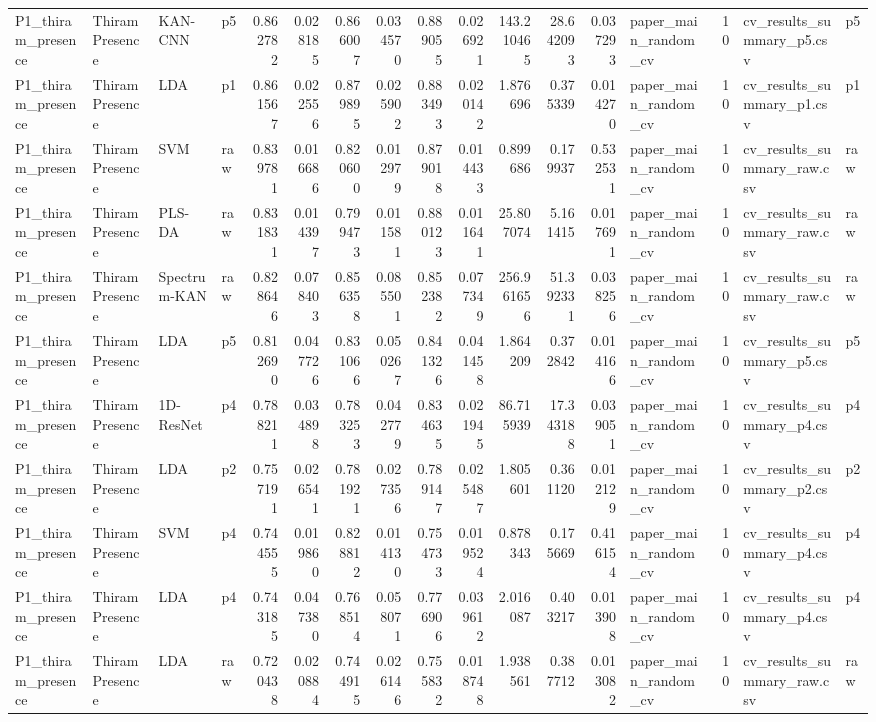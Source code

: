 \begin{tabular}{llllrrrrrrrrrlrll}
P1_thiram_presence & Thiram Presence & KAN-CNN & p5 & 0.862782 & 0.028185 & 0.866007 & 0.034570 & 0.889055 & 0.026921 & 143.210465 & 28.642093 & 0.037293 & paper_main_random_cv & 10 & cv_results_summary_p5.csv & p5 \\
P1_thiram_presence & Thiram Presence & LDA & p1 & 0.861567 & 0.022556 & 0.879895 & 0.025902 & 0.883493 & 0.020142 & 1.876696 & 0.375339 & 0.014270 & paper_main_random_cv & 10 & cv_results_summary_p1.csv & p1 \\
P1_thiram_presence & Thiram Presence & SVM & raw & 0.839781 & 0.016686 & 0.820600 & 0.012979 & 0.879018 & 0.014433 & 0.899686 & 0.179937 & 0.532531 & paper_main_random_cv & 10 & cv_results_summary_raw.csv & raw \\
P1_thiram_presence & Thiram Presence & PLS-DA & raw & 0.831831 & 0.014397 & 0.799473 & 0.011581 & 0.880123 & 0.011641 & 25.807074 & 5.161415 & 0.017691 & paper_main_random_cv & 10 & cv_results_summary_raw.csv & raw \\
P1_thiram_presence & Thiram Presence & Spectrum-KAN & raw & 0.828646 & 0.078403 & 0.856358 & 0.085501 & 0.852382 & 0.077349 & 256.961656 & 51.392331 & 0.038256 & paper_main_random_cv & 10 & cv_results_summary_raw.csv & raw \\
P1_thiram_presence & Thiram Presence & LDA & p5 & 0.812690 & 0.047726 & 0.831066 & 0.050267 & 0.841326 & 0.041458 & 1.864209 & 0.372842 & 0.014166 & paper_main_random_cv & 10 & cv_results_summary_p5.csv & p5 \\
P1_thiram_presence & Thiram Presence & 1D-ResNet & p4 & 0.788211 & 0.034898 & 0.783253 & 0.042779 & 0.834635 & 0.021945 & 86.715939 & 17.343188 & 0.039051 & paper_main_random_cv & 10 & cv_results_summary_p4.csv & p4 \\
P1_thiram_presence & Thiram Presence & LDA & p2 & 0.757191 & 0.026541 & 0.781921 & 0.027356 & 0.789147 & 0.025487 & 1.805601 & 0.361120 & 0.012129 & paper_main_random_cv & 10 & cv_results_summary_p2.csv & p2 \\
P1_thiram_presence & Thiram Presence & SVM & p4 & 0.744555 & 0.019860 & 0.828812 & 0.014130 & 0.754733 & 0.019524 & 0.878343 & 0.175669 & 0.416154 & paper_main_random_cv & 10 & cv_results_summary_p4.csv & p4 \\
P1_thiram_presence & Thiram Presence & LDA & p4 & 0.743185 & 0.047380 & 0.768514 & 0.058071 & 0.776906 & 0.039612 & 2.016087 & 0.403217 & 0.013908 & paper_main_random_cv & 10 & cv_results_summary_p4.csv & p4 \\
P1_thiram_presence & Thiram Presence & LDA & raw & 0.720438 & 0.020884 & 0.744915 & 0.026146 & 0.755832 & 0.018748 & 1.938561 & 0.387712 & 0.013082 & paper_main_random_cv & 10 & cv_results_summary_raw.csv & raw \\

\end{tabular}
